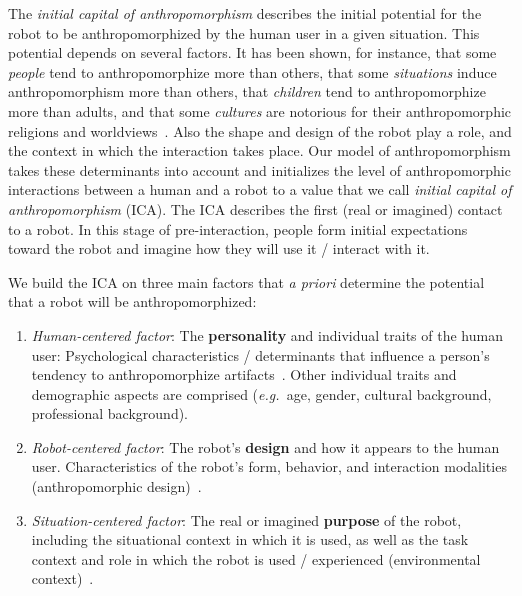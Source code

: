 \documentclass{sig-alternate-2013}
\newcommand{\eg}{{\textit{e.g.~}}}
\begin{document}
The \emph{initial capital of anthropomorphism} describes the initial potential
for the robot to be anthropomorphized by the human user in a given situation.
This potential depends on several factors. It has been shown, for instance, that
some \textit{people} tend to anthropomorphize more than others, that some
\textit{situations} induce anthropomorphism more than others, that
\textit{children} tend to anthropomorphize more than adults, and that some
\textit{cultures} are notorious for their anthropomorphic religions and
worldviews~\cite{epley_when_2008}. Also the shape and design of the robot play a
role, and the context in which the interaction takes place. Our model of
anthropomorphism takes these determinants into account and initializes the level
of anthropomorphic interactions between a human and a robot to a value that we
call \emph{initial capital of anthropomorphism} (ICA). The ICA describes the
first (real or imagined) contact to a robot. In this stage of pre-interaction,
people form initial expectations toward the robot and imagine how they will use
it / interact with it.

We build the ICA on three main factors that \emph{a priori} determine the
potential that a robot will be anthropomorphized:

\begin{enumerate}

    \item \emph{Human-centered factor}: The \textbf{personality} and individual
        traits of the human user: Psychological characteristics / determinants
        that influence a person's tendency to anthropomorphize
        artifacts~\cite{epley_seeing_2007}. Other individual traits and
        demographic aspects are comprised (\eg age, gender, cultural
        background, professional background).
	
    \item \emph{Robot-centered factor}: The robot's \textbf{design} and how it
        appears to the human user. Characteristics of the robot's form,
        behavior, and interaction modalities (anthropomorphic
        design)~\cite{fong_survey_2003}.
	
    \item \emph{Situation-centered factor}: The real or imagined
        \textbf{purpose} of the robot, including the situational context in
        which it is used, as well as the task context and role in which the robot is 				used / experienced (environmental context)~\cite{joosse_what_2013}.

\end{enumerate}	
\end{document}
